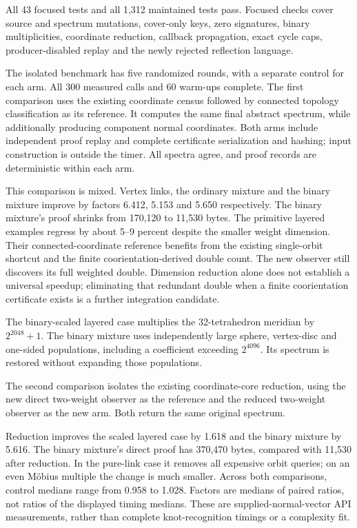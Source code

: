 All 43 focused tests and all 1,312 maintained tests pass. Focused checks cover
source and spectrum mutations, cover-only keys, zero signatures, binary
multiplicities, coordinate reduction, callback propagation, exact cycle caps,
producer-disabled replay and the newly rejected reflection language.

The isolated benchmark has five randomized rounds, with a separate control
for each arm. All 300 measured calls and 60 warm-ups complete. The first
comparison uses the existing coordinate census followed by connected topology
classification as its reference. It computes the same final abstract spectrum,
while additionally producing component normal coordinates. Both arms include
independent proof replay and complete certificate serialization and hashing;
input construction is outside the timer. All spectra agree, and proof records
are deterministic within each arm.


This comparison is mixed. Vertex links, the ordinary mixture and the binary
mixture improve by factors 6.412, 5.153 and 5.650 respectively. The binary
mixture's proof shrinks from 170,120 to 11,530 bytes. The primitive layered
examples regress by about 5--9 percent despite the smaller weight dimension.
Their connected-coordinate reference benefits from the existing single-orbit
shortcut and the finite coorientation-derived double count. The new observer
still discovers its full weighted double. Dimension reduction alone does
not establish a universal speedup; eliminating that redundant double when
a finite coorientation certificate exists is a further integration candidate.

The binary-scaled layered case multiplies the 32-tetrahedron meridian by
$2^{2048}+1$. The binary mixture uses independently large sphere, vertex-disc
and one-sided populations, including a coefficient exceeding $2^{4096}$.
Its spectrum is restored without expanding those populations.

The second comparison isolates the existing coordinate-core reduction,
using the new direct two-weight observer as the reference and the reduced
two-weight observer as the new arm. Both return the same original spectrum.


Reduction improves the scaled layered case by 1.618 and the binary mixture
by 5.616. The binary mixture's direct proof has 370,470 bytes, compared with
11,530 after reduction. In the pure-link case it removes all expensive
orbit queries; on an even M\"obius multiple the change is much smaller.
Across both comparisons, control medians range from 0.958 to 1.028. Factors
are medians of paired ratios, not ratios of the displayed timing medians.
These are supplied-normal-vector API measurements, rather than complete
knot-recognition timings or a complexity fit.
